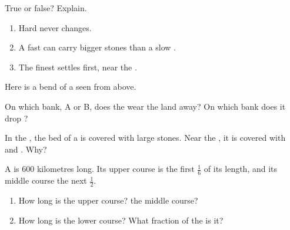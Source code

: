 \begin{exercise}[$\star$]\label{exo:g5:water-shapes-the-land:4}
True or false? Explain.
\begin{enumerate}
  \item[(a)] Hard  never changes.
  \item[(b)] A fast  can carry bigger stones than a slow .
  \item[(c)] The finest  settles first, near the .
\end{enumerate}
\end{exercise}

\begin{exercise}[$\star$]\label{exo:g5:water-shapes-the-land:5}
Here is a bend of a  seen from above.

\begin{center}
\end{center}
On which bank, A or B, does the  wear the land away? On which bank
does it drop ?
\end{exercise}

\begin{exercise}[$\star$]\label{exo:g5:water-shapes-the-land:6}
In the , the bed of a  is covered with large stones. Near the
, it is covered with  and . Why?
\end{exercise}

\begin{exercise}[$\star\star$]\label{exo:g5:water-shapes-the-land:7}
A  is 600 kilometres long. Its upper course is the first
$\frac{1}{6}$ of its length, and its middle course the next
$\frac{1}{2}$.
\begin{enumerate}
  \item[(a)] How long is the upper course? the middle course?
  \item[(b)] How long is the lower course? What fraction of the  is
        it?
\end{enumerate}
\end{exercise}


